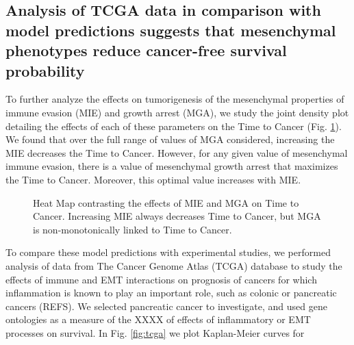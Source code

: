 \documentclass[11pt, a4paper, preprint]{article}
\begin{document}
\subsection{Analysis of TCGA data in comparison with model predictions suggests that mesenchymal phenotypes reduce cancer-free survival probability}

To further analyze the effects on tumorigenesis of the mesenchymal properties of immune evasion (MIE) and growth arrest (MGA), we study the joint density plot detailing the effects of each of these parameters on the Time to Cancer (Fig. \ref{fig:MIEvsMGA}). We found that over the full range of values of MGA considered, increasing the MIE decreases the Time to Cancer. However, for any given value of mesenchymal immune evasion, there is a value of mesenchymal growth arrest that maximizes the Time to Cancer. Moreover, this optimal value increases with MIE. 

\begin{figure}[H]
\center
{}
\caption{Heat Map contrasting the effects of MIE and MGA on Time to Cancer. Increasing MIE always decreases Time to Cancer, but MGA is non-monotonically linked to Time to Cancer.}
\label{fig:MIEvsMGA}
\end{figure}

To compare these model predictions with experimental studies, we performed analysis of data from The Cancer Genome Atlas (TCGA) database to study the effects of immune and EMT interactions on prognosis of cancers for which inflammation is known to play an important role, such as colonic or pancreatic cancers (REFS). We selected pancreatic cancer to investigate, and used gene ontologies as a measure of the XXXX of effects of inflammatory or EMT processes on survival. In Fig. \ref{fig:tcga} we plot Kaplan-Meier curves for 
\end{document}
